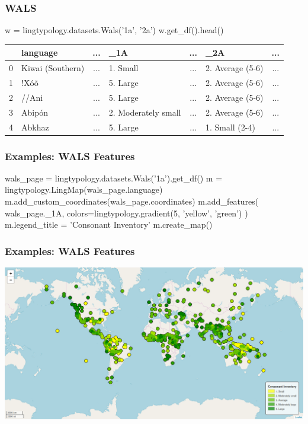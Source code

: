 \documentclass{beamer}
\begin{document}
\begin{frame}[fragile]
\frametitle{WALS}
\begin{python}
w = lingtypology.datasets.Wals('1a', '2a')
w.get_df().head()
\end{python}
\begin{adjustbox}{max width=\textwidth}
\begin{tabular}{llclclc}
\toprule
{} &           language & ... & \_1A & ... & \_2A & ... \\
\midrule
0 &   Kiwai (Southern) & ... &  1. Small & ... &  2. Average (5-6) & ...\\
1 &               !Xóõ & ... &  5. Large & ... &  2. Average (5-6) & ...\\
2 &              //Ani & ... &  5. Large & ... &  2. Average (5-6) & ...\\
3 &             Abipón & ... &  2. Moderately small & ... &  2. Average (5-6) & ...\\
4 &             Abkhaz & ... &  5. Large & ... &    1. Small (2-4) & ...\\
\bottomrule
\end{tabular}
\end{adjustbox}
\end{frame}

\begin{frame}[fragile]
\frametitle{Examples: WALS Features}
\begin{python}
wals_page = lingtypology.datasets.Wals('1a').get_df()
m = lingtypology.LingMap(wals_page.language)
m.add_custom_coordinates(wals_page.coordinates)
m.add_features(
    wals_page._1A,
    colors=lingtypology.gradient(5, 'yellow', 'green')
)
m.legend_title = 'Consonant Inventory'
m.create_map()
\end{python}
\end{frame}

\begin{frame}
\frametitle{Examples: WALS Features}
\includegraphics[width=\textwidth]{images/LingtypologyStrokeAppearance.png}
\end{frame}
\end{document}
